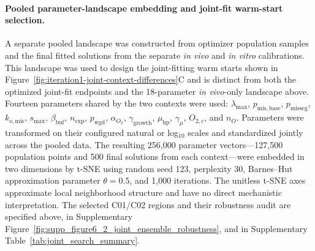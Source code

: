 \documentclass[11pt]{article}
\let\cite\supercite
\begin{document}
\paragraph{Pooled parameter-landscape embedding and joint-fit warm-start selection.}
A separate pooled landscape was constructed from optimizer population samples and the final fitted solutions from the separate \textit{in vivo} and \textit{in vitro} calibrations. This landscape was used to design the joint-fitting warm starts shown in Figure~\ref{fig:iteration1-joint-context-differences}C and is distinct from both the optimized joint-fit endpoints and the 18-parameter \textit{in vivo}-only landscape above. Fourteen parameters shared by the two contexts were used: $\lambda_{\max}$, $p_{\mathrm{mis,base}}$, $p_{\mathrm{misseg}}$, $k_{o,\mathrm{mis}}$, $s_{\max}$, $\beta_{\mathrm{buf}}$, $n_{\mathrm{exp}}$, $p_{\mathrm{wgd}}$, $\alpha_{O_2}$, $\gamma_{\mathrm{growth}}$, $\mu_{\mathrm{hp}}$, $\gamma_\mu$, $O_{2,c}$, and $n_O$. Parameters were transformed on their configured natural or log$_{10}$ scales and standardized jointly across the pooled data. The resulting 256,000 parameter vectors---127,500 population points and 500 final solutions from each context---were embedded in two dimensions by t-SNE \cite{maaten_visualizing_2008} using random seed 123, perplexity 30, Barnes--Hut approximation parameter $\theta=0.5$, and 1,000 iterations. The unitless t-SNE axes approximate local neighborhood structure and have no direct mechanistic interpretation. The selected C01/C02 regions and their robustness audit are specified above, in Supplementary Figure~\ref{fig:supp_figure6_2_joint_ensemble_robustness}, and in Supplementary Table~\ref{tab:joint_search_summary}.
\end{document}
